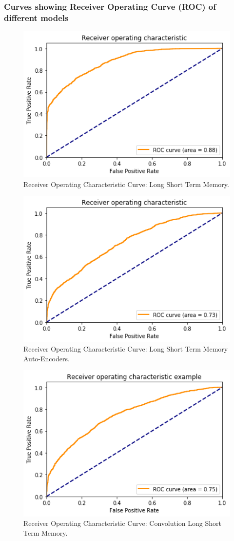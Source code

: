 \documentclass[12pt,a4paper]{article}
\begin{document}
\subsubsection{Curves showing Receiver Operating Curve (ROC) of different models}
\begin{figure}[H]
    \centerline{\includegraphics[width=4.5in]{lstm16_4.png}}
    \caption{Receiver Operating Characteristic Curve: Long Short Term Memory.}
\end{figure}
\begin{figure}[H]
    \centerline{\includegraphics[width=4.5in]{lstm_auto_encoder4.png}}
    \caption{Receiver Operating Characteristic Curve: Long Short Term Memory Auto-Encoders.}
\end{figure}
\begin{figure}[H]
    \centerline{\includegraphics[width=4.5in]{clstm4.png}}
    \caption{Receiver Operating Characteristic Curve: Convolution Long Short Term Memory.}
\end{figure}
\end{document}
